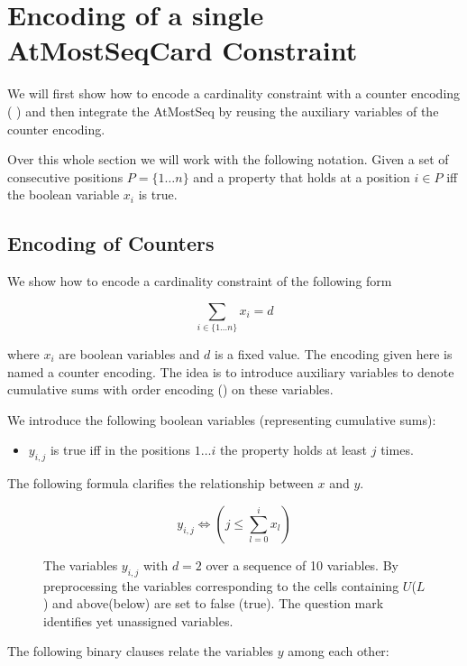 \documentclass[]{llncs}
\newcommand{\TODO}[1]{ {\color{red}{#1} }}
\newcommand{\AtMostSeqCard}{AtMostSeqCard }
\begin{document}
\section{Encoding of a single \AtMostSeqCard Constraint}


We will first show how to encode a cardinality constraint with a counter
encoding (\TODO{First publication?}) and then integrate the AtMostSeq
by reusing the auxiliary variables of the counter encoding. 

Over this whole section we will work with the following notation. Given
a set of consecutive positions $P=\{1\ldots n\}$ and a property that
holds at a position $i\in P$ iff the boolean variable $x_i$ is true. 

\subsection{Encoding of Counters}

We show how to encode a cardinality constraint of the following form 

$$ \sum_{i\in \{1\ldots n\}} x_{i} = d $$

where $x_i$ are boolean variables and $d$ is a fixed value. The encoding
given here is named a counter encoding. The idea is to introduce
auxiliary variables to denote cumulative sums with order encoding
(\cite{Tamura09}) on these variables. 

We introduce the following boolean variables (representing cumulative sums): 

\begin{itemize}
    \item $y_{i,j}$ is true iff in the positions $1 \ldots i$ the
        property holds at least $j$ times.        
\end{itemize}

The following formula clarifies the relationship between $x$ and $y$.

$$ y_{i,j} \iff (j \leq \sum_{l=0}^{i} x_{l}) $$


\begin{figure}
\centering 
\caption{The variables $y_{i,j}$ with $d=2$ over a sequence of 10
variables. By preprocessing the variables corresponding to the cells
containing $U$($L$) and above(below) are set to false (true).  The
question mark identifies yet unassigned variables.}
%
\label{ex:1}
\end{figure}

The following binary clauses relate the variables $y$ among each other:
\end{document}
